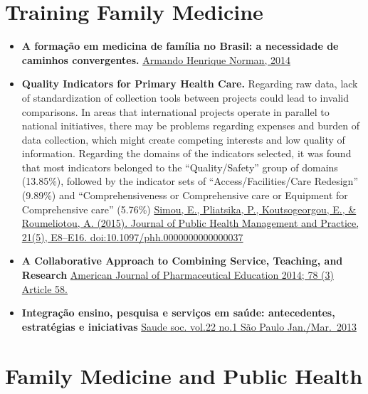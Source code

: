\documentclass[]{book}
\begin{document}
\hypertarget{training-family-medicine}{%
\section*{Training Family Medicine}\label{training-family-medicine}}

\begin{itemize}
\item
  \textbf{A formação em medicina de família no Brasil: a necessidade de caminhos convergentes.} \href{https://www.rbmfc.org.br/rbmfc/article/view/875}{Armando Henrique Norman, 2014}
\item
  \textbf{Quality Indicators for Primary Health Care.} Regarding raw data, lack of standardization of collection tools between projects could lead to invalid comparisons. In areas that international projects operate in parallel to national initiatives, there may be problems regarding expenses and burden of data collection, which might create competing interests and low quality of information. Regarding the domains of the indicators selected,
  it was found that most indicators belonged to the ``Quality/Safety'' group of domains (13.85\%), followed by the indicator sets of ``Access/Facilities/Care Redesign'' (9.89\%) and ``Comprehensiveness or Comprehensive care or Equipment for Comprehensive care''
  (5.76\%) \href{https://sci-hub.tw/10.1097/phh.0000000000000037}{Simou, E., Pliatsika, P., Koutsogeorgou, E., \& Roumeliotou, A. (2015). Journal of Public Health Management and Practice, 21(5), E8--E16. doi:10.1097/phh.0000000000000037}
\item
  \textbf{A Collaborative Approach to Combining Service, Teaching, and Research} \href{https://www.ncbi.nlm.nih.gov/pmc/articles/PMC3996390/pdf/ajpe78358.pdf}{American Journal of Pharmaceutical Education 2014; 78 (3) Article 58.}
\item
  \textbf{Integração ensino, pesquisa e serviços em saúde: antecedentes, estratégias e iniciativas} \href{http://www.scielo.br/pdf/sausoc/v22n1/17.pdf}{Saude soc. vol.22 no.1 São Paulo Jan./Mar.~2013}
\end{itemize}

\hypertarget{family-medicine-and-public-health}{%
\section*{Family Medicine and Public Health}\label{family-medicine-and-public-health}}
\end{document}

